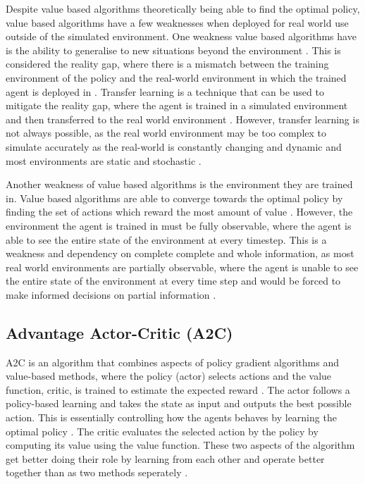 Despite value based algorithms theoretically being able to find the optimal policy, value based algorithms have a few weaknesses when deployed for real world use outside of the simulated environment. One weakness value based algorithms have is the ability to generalise to new situations beyond the environment \cite{OdelTruxillo2023}. This is considered the reality gap, where there is a mismatch between the training environment of the policy and the real-world environment in which the trained agent is deployed in \cite{tobin2017domain}. Transfer learning is a technique that can be used to mitigate the reality gap, where the agent is trained in a simulated environment and then transferred to the real world environment \cite{OdelTruxillo2023}. However, transfer learning is not always possible, as the real world environment may be too complex to simulate accurately as the real-world is constantly changing and dynamic and most environments are static and stochastic \cite{OdelTruxillo2023}. 

Another weakness of value based algorithms is the environment they are trained in. Value based algorithms are able to converge towards the optimal policy by finding the set of actions which reward the most amount of value \cite{OdelTruxillo2023}. However, the environment the agent is trained in must be fully observable, where the agent is able to see the entire state of the environment at every timestep. This is a weakness and dependency on complete complete and whole information, as most real world environments are partially observable, where the agent is unable to see the entire state of the environment at every time step and would be forced to make informed decisions on partial information \cite{dulac2021challenges}. 

\subsection{Advantage Actor-Critic (A2C)}

A2C is an algorithm that combines aspects of policy gradient algorithms and value-based methods, where the policy (actor) selects actions and the value function, critic, is trained to estimate the expected reward \cite{mnih2013playing}. The actor follows a policy-based learning and takes the state as input and outputs the best possible action. This is essentially controlling how the agents behaves by learning the optimal policy \cite{SergiosKaragiannakos2018}. The critic evaluates the selected action by the policy by computing its value using the value function. These two aspects of the algorithm get better doing their role by learning from each other and operate better together than as two methods seperately \cite{SergiosKaragiannakos2018}. 

